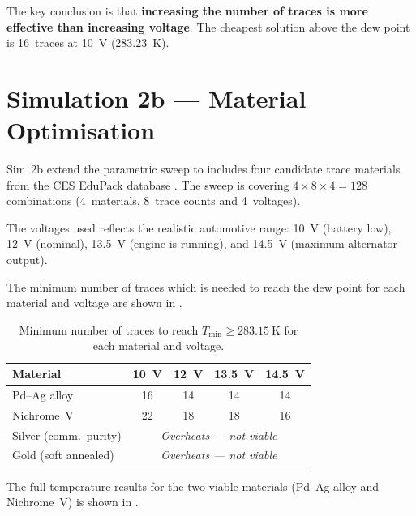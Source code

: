 The key conclusion is that \textbf{increasing the number of traces is more effective than increasing voltage}. The cheapest solution above the dew point is 16~traces at \SI{10}{\volt} (\SI{283.23}{\kelvin}).


\section{Simulation 2b --- Material Optimisation}
\label{sec:sim2b}

Sim~2b extend the parametric sweep to includes four candidate trace materials from the CES EduPack database \cite{edupack}. The sweep is covering $4 \times 8 \times 4 = 128$ combinations (4~materials, 8~trace counts and 4~voltages).

The voltages used reflects the realistic automotive range: \SI{10}{\volt} (battery low), \SI{12}{\volt} (nominal), \SI{13.5}{\volt} (engine is running), and \SI{14.5}{\volt} (maximum alternator output).

The minimum number of traces which is needed to reach the dew point for each material and voltage are shown in .

\begin{table}[H]
    \centering
    \caption{Minimum number of traces to reach $T_\text{min} \geq \SI{283.15}{\kelvin}$ for each material and voltage.}
    \label{tab:sim2b-min-traces}
    \begin{tabular}{@{}lcccc@{}}
        \toprule
        \textbf{Material} & \SI{10}{\volt} & \SI{12}{\volt} & \SI{13.5}{\volt} & \SI{14.5}{\volt} \\
        \midrule
        Pd--Ag alloy  & 16 & 14 & 14 & 14 \\
        Nichrome~V     & 22 & 18 & 18 & 16 \\
        Silver (comm.\ purity) & \multicolumn{4}{c}{\emph{Overheats --- not viable}} \\
        Gold (soft annealed)   & \multicolumn{4}{c}{\emph{Overheats --- not viable}} \\
        \bottomrule
    \end{tabular}
\end{table}

The full temperature results for the two viable materials (Pd--Ag alloy and Nichrome~V) is shown in .

